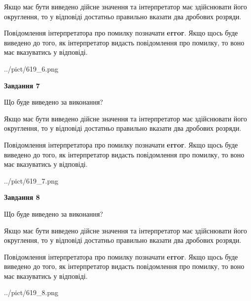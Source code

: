 \documentclass[12pt, ukrainian]{article}
\begin{document}
{\begin {Large}
Якщо має бути виведено дійсне значення та інтерпретатор має здійснювати його округлення, 
то у відповіді достатньо правильно вказати два дробових розряди.

Повідомлення інтерпретатора про помилку позначати \textbf{error}.
Якщо щось буде виведено до того, як інтерпретатор видасть повідомлення про помилку, 
то воно має вказуватись у відповіді. \par

\begin{center}
	{../pict/619_6.png}
\end{center}
\newpage

{\begin {center}\textbf{Завдання 7}\end {center}}\par
Що буде виведено за виконання? \par

Якщо має бути виведено дійсне значення та інтерпретатор має здійснювати його округлення, 
то у відповіді достатньо правильно вказати два дробових розряди.

Повідомлення інтерпретатора про помилку позначати \textbf{error}.
Якщо щось буде виведено до того, як інтерпретатор видасть повідомлення про помилку, 
то воно має вказуватись у відповіді. \par

\begin{center}
	{../pict/619_7.png}
\end{center}
\newpage

{\begin {center}\textbf{Завдання 8}\end {center}}\par
Що буде виведено за виконання? \par

Якщо має бути виведено дійсне значення та інтерпретатор має здійснювати його округлення, 
то у відповіді достатньо правильно вказати два дробових розряди.

Повідомлення інтерпретатора про помилку позначати \textbf{error}.
Якщо щось буде виведено до того, як інтерпретатор видасть повідомлення про помилку, 
то воно має вказуватись у відповіді. \par

\begin{center}
	{../pict/619_8.png}
\end{center}
\newpage


\end{Large}}
\end{document}
